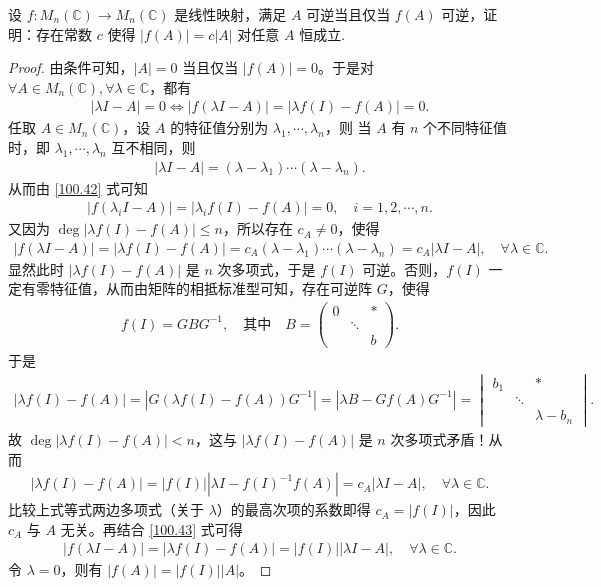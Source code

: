 \documentclass[../../main.tex]{subfiles}%
\begin{document}
\begin{example}
设 $f: M_n(\mathbb{C}) \to M_n(\mathbb{C})$ 是线性映射，满足 $A$ 可逆当且仅当 $f(A)$ 可逆，证明：存在常数 $c$ 使得 $|f(A)| = c|A|$ 对任意 $A$ 恒成立. 
\end{example}
\begin{proof}
由条件可知，$|A| = 0$ 当且仅当 $|f(A)| = 0$。于是对 $\forall A \in M_n(\mathbb{C}), \forall \lambda \in \mathbb{C}$，都有
\begin{align}
|\lambda I - A| = 0 \Longleftrightarrow |f(\lambda I - A)| = |\lambda f(I) - f(A)| = 0. \label{100.42}
\end{align}
任取 $A \in M_n(\mathbb{C})$，设 $A$ 的特征值分别为 $\lambda_1, \cdots, \lambda_n$，则
当 $A$ 有 $n$ 个不同特征值时，即 $\lambda_1, \cdots, \lambda_n$ 互不相同，则
\begin{align*}
|\lambda I - A| = (\lambda - \lambda_1) \cdots (\lambda - \lambda_n).
\end{align*}
从而由 \eqref{100.42} 式可知
\begin{align*}
|f(\lambda_i I - A)| = |\lambda_i f(I) - f(A)| = 0, \quad i = 1, 2, \cdots, n.
\end{align*}
又因为 $\deg |\lambda f(I) - f(A)| \leqslant n$，所以存在 $c_A \ne 0$，使得
\begin{align}
|f(\lambda I - A)| = |\lambda f(I) - f(A)| = c_A (\lambda - \lambda_1) \cdots (\lambda - \lambda_n) = c_A |\lambda I - A|, \quad \forall \lambda \in \mathbb{C}. \label{100.43}
\end{align}
显然此时 $|\lambda f(I) - f(A)|$ 是 $n$ 次多项式，于是 $f(I)$ 可逆。否则，$f(I)$ 一定有零特征值，从而由矩阵的相抵标准型可知，存在可逆阵 $G$，使得
\begin{align*}
f(I) = G B G^{-1}, \quad \text{其中} \quad B = \begin{pmatrix}
0 & & * \\
& \ddots & \\
& & b
\end{pmatrix}.
\end{align*}
于是
\begin{align*}
|\lambda f(I) - f(A)| = |G (\lambda f(I) - f(A)) G^{-1}| = |\lambda B - G f(A) G^{-1}| = \begin{vmatrix}
b_1 & & * \\
& \ddots & \\
& & \lambda - b_n
\end{vmatrix}.
\end{align*}
故 $\deg |\lambda f(I) - f(A)| < n$，这与 $|\lambda f(I) - f(A)|$ 是 $n$ 次多项式矛盾！从而
\begin{align*}
|\lambda f(I) - f(A)| = |f(I)| |\lambda I - f(I)^{-1} f(A)| = c_A |\lambda I - A|, \quad \forall \lambda \in \mathbb{C}.
\end{align*}
比较上式等式两边多项式（关于 $\lambda$）的最高次项的系数即得 $c_A = |f(I)|$，因此 $c_A$ 与 $A$ 无关。再结合 \eqref{100.43} 式可得
\begin{align*}
|f(\lambda I - A)| = |\lambda f(I) - f(A)| = |f(I)| |\lambda I - A|, \quad \forall \lambda \in \mathbb{C}.
\end{align*}
令 $\lambda = 0$，则有 $|f(A)| = |f(I)| |A|$。


\end{proof}
\end{document}
